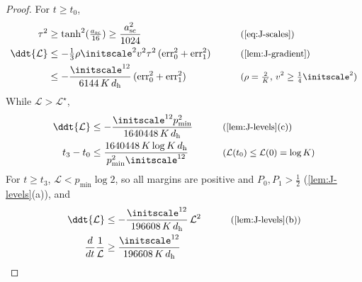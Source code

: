 \begin{proof}
For $t\ge t_0$,
\begin{alignat*}{2}
 \tau^2&\ge\tanh^2(\tfrac{a_{\mathrm{sc}}}{16})\ge\frac{a_{\mathrm{sc}}^2}{1024} &\qquad& \why{\cref{eq:J-scales}}\\
 \ddt{\mathcal L}&\le-\tfrac{1}{3}\rho\initscale^2v^2\tau^2\,(\mathrm{err}_0^2+\mathrm{err}_1^2) && \why{\cref{lem:J-gradient}}\\
 &\le-\frac{\initscale^{12}}{6144\,K\,d_{\mathrm h}}\,(\mathrm{err}_0^2+\mathrm{err}_1^2) && \why{$\rho=\tfrac{2}{K}$, $v^2\ge\tfrac{1}{4}\initscale^2$}
\end{alignat*}
While $\mathcal L>\mathcal L^\star$,
\begin{alignat*}{2}
 \ddt{\mathcal L}&\le-\frac{\initscale^{12}p_{\min}^2}{1640448\,K\,d_{\mathrm h}} &\qquad& \why{\cref{lem:J-levels}(c)}\\
 t_3-t_0&\le\frac{1640448\,K\log K\,d_{\mathrm h}}{p_{\min}^2\initscale^{12}} && \why{$\mathcal L(t_0)\le\mathcal L(0)=\log K$}
\end{alignat*}
For $t\ge t_3$, $\mathcal L<p_{\min}\log2$, so all margins are positive and $P_0,P_1>\frac{1}{2}$ (\cref{lem:J-levels}(a)), and
\begin{alignat*}{2}
 \ddt{\mathcal L}&\le-\frac{\initscale^{12}}{196608\,K\,d_{\mathrm h}}\,\mathcal L^2 &\qquad& \why{\cref{lem:J-levels}(b)}\\
 \frac{d}{dt}\frac{1}{\mathcal L}&\ge\frac{\initscale^{12}}{196608\,K\,d_{\mathrm h}} && \qedhere
\end{alignat*}
\end{proof}

